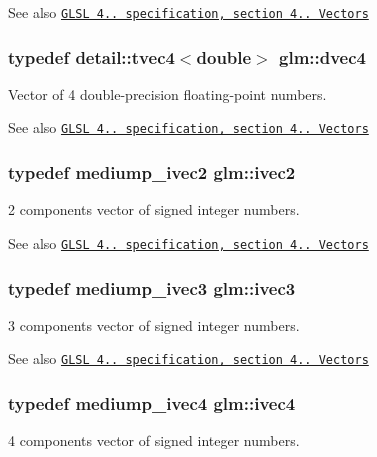 \begin{DoxySeeAlso}{\-See also}
\href{http://www.opengl.org/registry/doc/GLSLangSpec.4.20.8.pdf}{\tt \-G\-L\-S\-L 4.. specification, section 4.. \-Vectors} 
\end{DoxySeeAlso}
\hypertarget{group__core__types_ga0127b78c4c51b270b2a2ef848c01b5d9}{
\subsubsection[{dvec4}]{\setlength{\rightskip}{0pt plus 5cm}typedef detail\-::tvec4$<$double$>$ {\bf glm\-::dvec4}}}\label{group__core__types_ga0127b78c4c51b270b2a2ef848c01b5d9}
\-Vector of 4 double-\/precision floating-\/point numbers.

\begin{DoxySeeAlso}{\-See also}
\href{http://www.opengl.org/registry/doc/GLSLangSpec.4.20.8.pdf}{\tt \-G\-L\-S\-L 4.. specification, section 4.. \-Vectors} 
\end{DoxySeeAlso}
\hypertarget{group__core__types_ga606b9d298d8aaa55c449182c340b4622}{
\subsubsection[{ivec2}]{\setlength{\rightskip}{0pt plus 5cm}typedef mediump\-\_\-ivec2 {\bf glm\-::ivec2}}}\label{group__core__types_ga606b9d298d8aaa55c449182c340b4622}
2 components vector of signed integer numbers.

\begin{DoxySeeAlso}{\-See also}
\href{http://www.opengl.org/registry/doc/GLSLangSpec.4.20.8.pdf}{\tt \-G\-L\-S\-L 4.. specification, section 4.. \-Vectors} 
\end{DoxySeeAlso}
\hypertarget{group__core__types_ga620442eba2e3b49317b24fd6d141b0f8}{
\subsubsection[{ivec3}]{\setlength{\rightskip}{0pt plus 5cm}typedef mediump\-\_\-ivec3 {\bf glm\-::ivec3}}}\label{group__core__types_ga620442eba2e3b49317b24fd6d141b0f8}
3 components vector of signed integer numbers.

\begin{DoxySeeAlso}{\-See also}
\href{http://www.opengl.org/registry/doc/GLSLangSpec.4.20.8.pdf}{\tt \-G\-L\-S\-L 4.. specification, section 4.. \-Vectors} 
\end{DoxySeeAlso}
\hypertarget{group__core__types_ga997dbad029105eea19ccd8a1455a6fe3}{
\subsubsection[{ivec4}]{\setlength{\rightskip}{0pt plus 5cm}typedef mediump\-\_\-ivec4 {\bf glm\-::ivec4}}}\label{group__core__types_ga997dbad029105eea19ccd8a1455a6fe3}
4 components vector of signed integer numbers.

